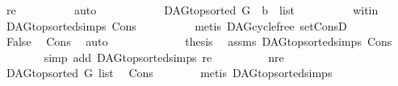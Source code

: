 \begin{isabellebody}
\ re\isanewline
\ \ \ \ \ \ \ \ \isamarkupfalse%
\ auto\ \isanewline
\ \ \ \ \ \ \isamarkupfalse%
\ \isamarkupfalse%
\ {\isachardoublequoteopen}{\isasymnot}\ DAG{\isachardot}{\kern0pt}top{\isacharunderscore}{\kern0pt}sorted\ G\ \ {\isacharparenleft}{\kern0pt}b\ {\isacharhash}{\kern0pt}\ list{\isacharparenright}{\kern0pt}{\isachardoublequoteclose}\isanewline
\ \ \ \ \ \ \ \ \isamarkupfalse%
\ wit{\isacharunderscore}{\kern0pt}in\ \isamarkupfalse%
\ DAG{\isachardot}{\kern0pt}top{\isacharunderscore}{\kern0pt}sorted{\isachardot}{\kern0pt}simps{\isacharparenleft}{\kern0pt}{}{\isacharparenright}{\kern0pt}\ Cons{\isacharparenleft}{\kern0pt}{}{\isacharparenright}{\kern0pt}\isanewline
\ \ \ \ \ \ \ \ \isamarkupfalse%
\ {\isacharparenleft}{\kern0pt}metis\ DAG{\isachardot}{\kern0pt}cycle{\isacharunderscore}{\kern0pt}free\ set{\isacharunderscore}{\kern0pt}ConsD{\isacharparenright}{\kern0pt}\ \isanewline
\ \ \ \ \ \ \isamarkupfalse%
\ \isamarkupfalse%
\ {\isachardoublequoteopen}False{\isachardoublequoteclose}\ \isamarkupfalse%
\ Cons\ \isamarkupfalse%
\ auto\ \isanewline
\ \ \ \ \isamarkupfalse%
\isanewline
\ \ \ \ \isamarkupfalse%
\ \isamarkupfalse%
\ {\isacharquery}{\kern0pt}thesis\ \isamarkupfalse%
\ assms{\isacharparenleft}{\kern0pt}{}{\isacharparenright}{\kern0pt}\ DAG{\isachardot}{\kern0pt}top{\isacharunderscore}{\kern0pt}sorted{\isachardot}{\kern0pt}simps\ Cons\isanewline
\ \ \ \ \ \ \isamarkupfalse%
\ {\isacharparenleft}{\kern0pt}simp\ add{\isacharcolon}{\kern0pt}\ DAG{\isachardot}{\kern0pt}top{\isacharunderscore}{\kern0pt}sorted{\isachardot}{\kern0pt}simps{\isacharparenleft}{\kern0pt}{}{\isacharparenright}{\kern0pt}\ re{\isacharparenright}{\kern0pt}\ \isanewline
\ \ \isamarkupfalse%
\isanewline
\ \ \ \ \isamarkupfalse%
\ nre\isanewline
\ \ \ \ \isamarkupfalse%
\ {\isachardoublequoteopen}DAG{\isachardot}{\kern0pt}top{\isacharunderscore}{\kern0pt}sorted\ G\ list{\isachardoublequoteclose}\ \isamarkupfalse%
\ Cons{\isacharparenleft}{\kern0pt}{}{\isacharcomma}{\kern0pt}{}{\isacharparenright}{\kern0pt}\isanewline
\ \ \ \ \ \ \isamarkupfalse%
\ {\isacharparenleft}{\kern0pt}metis\ DAG{\isachardot}{\kern0pt}top{\isacharunderscore}{\kern0pt}sorted{\isachardot}{\kern0pt}simps{\isacharparenleft}{\kern0pt}{}{\isacharparenright}{\kern0pt}{\isacharparenright}{\kern0pt}\ \isanewline

\end{isabellebody}
